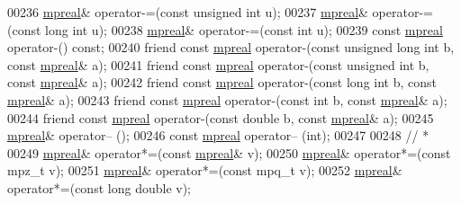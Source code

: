\begin{DoxyCode}
00236     \hyperlink{classmpfr_1_1mpreal}{mpreal}& operator-=(\textcolor{keyword}{const} \textcolor{keywordtype}{unsigned} \textcolor{keywordtype}{int} u);
00237     \hyperlink{classmpfr_1_1mpreal}{mpreal}& operator-=(\textcolor{keyword}{const} \textcolor{keywordtype}{long} \textcolor{keywordtype}{int} u);
00238     \hyperlink{classmpfr_1_1mpreal}{mpreal}& operator-=(\textcolor{keyword}{const} \textcolor{keywordtype}{int} u);
00239     \textcolor{keyword}{const} \hyperlink{classmpfr_1_1mpreal}{mpreal} operator-() \textcolor{keyword}{const};
00240     \textcolor{keyword}{friend} \textcolor{keyword}{const} \hyperlink{classmpfr_1_1mpreal}{mpreal} operator-(\textcolor{keyword}{const} \textcolor{keywordtype}{unsigned} \textcolor{keywordtype}{long} \textcolor{keywordtype}{int} b, \textcolor{keyword}{const} \hyperlink{classmpfr_1_1mpreal}{mpreal}& a);
00241     \textcolor{keyword}{friend} \textcolor{keyword}{const} \hyperlink{classmpfr_1_1mpreal}{mpreal} operator-(\textcolor{keyword}{const} \textcolor{keywordtype}{unsigned} \textcolor{keywordtype}{int} b,      \textcolor{keyword}{const} \hyperlink{classmpfr_1_1mpreal}{mpreal}& a);
00242     \textcolor{keyword}{friend} \textcolor{keyword}{const} \hyperlink{classmpfr_1_1mpreal}{mpreal} operator-(\textcolor{keyword}{const} \textcolor{keywordtype}{long} \textcolor{keywordtype}{int} b,          \textcolor{keyword}{const} \hyperlink{classmpfr_1_1mpreal}{mpreal}& a);
00243     \textcolor{keyword}{friend} \textcolor{keyword}{const} \hyperlink{classmpfr_1_1mpreal}{mpreal} operator-(\textcolor{keyword}{const} \textcolor{keywordtype}{int} b,               \textcolor{keyword}{const} \hyperlink{classmpfr_1_1mpreal}{mpreal}& a);
00244     \textcolor{keyword}{friend} \textcolor{keyword}{const} \hyperlink{classmpfr_1_1mpreal}{mpreal} operator-(\textcolor{keyword}{const} \textcolor{keywordtype}{double} b,            \textcolor{keyword}{const} \hyperlink{classmpfr_1_1mpreal}{mpreal}& a);
00245     \hyperlink{classmpfr_1_1mpreal}{mpreal}& operator-- ();
00246     \textcolor{keyword}{const} \hyperlink{classmpfr_1_1mpreal}{mpreal}  operator-- (\textcolor{keywordtype}{int});
00247 
00248     \textcolor{comment}{// *}
00249     \hyperlink{classmpfr_1_1mpreal}{mpreal}& operator*=(\textcolor{keyword}{const} \hyperlink{classmpfr_1_1mpreal}{mpreal}& v);
00250     \hyperlink{classmpfr_1_1mpreal}{mpreal}& operator*=(\textcolor{keyword}{const} mpz\_t v);
00251     \hyperlink{classmpfr_1_1mpreal}{mpreal}& operator*=(\textcolor{keyword}{const} mpq\_t v);
00252     \hyperlink{classmpfr_1_1mpreal}{mpreal}& operator*=(\textcolor{keyword}{const} \textcolor{keywordtype}{long} \textcolor{keywordtype}{double} v);

\end{DoxyCode}
